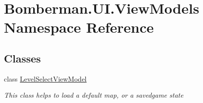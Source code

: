 \hypertarget{namespace_bomberman_1_1_u_i_1_1_view_models}{}\section{Bomberman.\+U\+I.\+View\+Models Namespace Reference}
\label{namespace_bomberman_1_1_u_i_1_1_view_models}
\subsection*{Classes}
\begin{DoxyCompactItemize}
\item 
class \mbox{\hyperlink{class_bomberman_1_1_u_i_1_1_view_models_1_1_level_select_view_model}{Level\+Select\+View\+Model}}
\begin{DoxyCompactList}\small\item\em This class helps to load a default map, or a savedgame state \end{DoxyCompactList}\end{DoxyCompactItemize}
